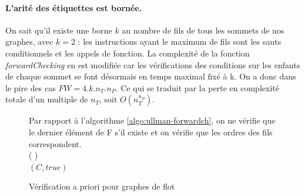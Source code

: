 \paragraph{L'arité des étiquettes est bornée.}
On sait qu'il existe une borne $k$ au nombre de fils de tous les sommets de nos graphes, avec $k=2$ : les instructions ayant le maximum de fils sont les sauts conditionnels et les appels de fonction.
La complexité de la fonction \emph{forwardChecking} en est modifiée car les vérifications des conditions sur les enfants de chaque sommet se font désormais en temps maximal fixé à k. On a donc dans le pire des cas $FW=4.k.n_T.n_P$. Ce qui se traduit par la perte en complexité totale d'un
multiple de $n_T$, soit $O(n_T^{n_P})$.

\begin{figure}[h]
\begin{algorithm}[H] %
\caption{Vérification a priori pour graphes de flot}
\SetAlgoLined
Par rapport à l'algorithme \ref{algo:ullman-forwardch}, on ne vérifie que le dernier élément de F s'il existe et on vérifie que les ordres des fils correspondent.\\
\Fn(
){}{
\\
\Return $(C, true)$
}
\label{algo:ullman-forwardch-site}
\end{algorithm}
\end{figure}

